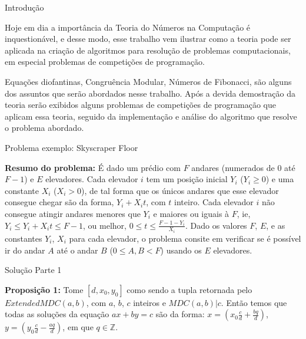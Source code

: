 \documentclass[final,hyperref={pdfpagelabels=false}]{beamer}
\begin{document}
\begin{frame}[t]
\begin{columns}[t]
\begin{column}{.465\textwidth}
\begin{block}{Introdução}
\begin{itemize}
Hoje em dia a importância da Teoria do Números na Computação é inquestionável, e desse modo, esse trabalho vem ilustrar como a teoria pode ser aplicada na criação de algoritmos para resolução de problemas computacionais, em especial problemas de competições de programação.

Equações diofantinas, Congruência Modular, Números de Fibonacci, são alguns dos assuntos que serão abordados nesse trabalho. Após a devida demostração da teoria serão exibidos alguns problemas de competições de programação que aplicam essa teoria, seguido da implementação e análise do algoritmo que resolve o problema abordado.
\end{itemize}

\end{block}


\begin{block}{Problema exemplo: Skyscraper Floor}

\textbf{Resumo do problema: }
É dado um prédio com $F$ andares (numerados de $0$ até $F-1$) e $E$ elevadores. Cada elevador $i$ tem um posição inicial $Y_i$ ($Y_i \geq 0$) e uma constante $X_i$ ($X_i > 0$),
de tal forma que os únicos andares que esse elevador consegue chegar são da forma, $Y_i+X_it$, com $t$ inteiro.
Cada elevador $i$ não consegue atingir andares menores que $Y_i$ e maiores ou iguais à $F$, ie, $Y_i \leq Y_i+X_it \leq F-1$, ou melhor, $0 \leq t \leq \frac{F-1-Y_i}{X_i}$.
Dado os valores $F$, $E$, e as constantes $Y_i$, $X_i$ para cada elevador, o problema consite em verificar se é possível ir do andar $A$ até o andar $B$ ($0\leq A,B <F$)
usando os $E$ elevadores.


\end{block}


\begin{block}{Solução Parte 1}

\textbf{Proposição 1: }
Tome $[d,x_0,y_0]$ como sendo a tupla retornada pelo $ExtendedMDC(a,b)$, com $a$, $b$, $c$ inteiros e $MDC(a,b)|c$.
Então temos que todas as soluções da equação $ax+by=c$ são da forma: $x=(x_0\frac{c}{d} + \frac{bq}{d})$, $y=(y_0\frac{c}{d} - \frac{aq}{d})$, em que $q\in\mathbb{Z}$.


\end{block}
\end{column}
\end{columns}
\end{frame}
\end{document}
